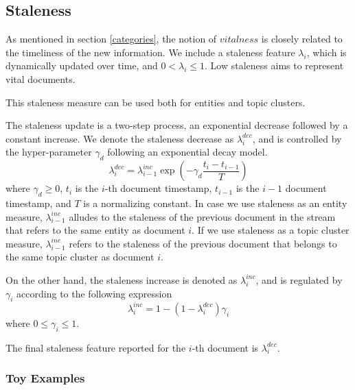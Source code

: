 \documentclass{article}
\begin{document}

\subsection{Staleness}
\label{staleness}

As mentioned in section \ref{categories}, the notion of $vitalness$ is closely related to the timeliness of the new information. We include a staleness feature $\lambda_i$, which is dynamically updated over time, and $0 < \lambda_i \leq 1$. Low staleness aims to represent vital documents.

This staleness measure can be used both for entities and topic clusters.

The staleness update is a two-step process, an exponential decrease followed by a constant increase.
We denote the staleness decrease as $\lambda^{dec}_i$, and is controlled by the hyper-parameter $\gamma_d$ following an exponential decay model.
\begin{equation}
\label{decrease}
\lambda^{dec}_i = \lambda^{inc}_{{i-1}} \exp{(-\gamma_d \frac{t_i-t_{i-1}}{T})}
\end{equation}
where $\gamma_d \geq 0$, $t_i$ is the $i$-th document timestamp, $t_{i-1}$ is the $i-1$ document timestamp, and $T$ is a normalizing constant.
In case we use staleness as an entity measure, $\lambda^{inc}_{i-1}$ alludes to the staleness of the previous document in the stream that refers to the same entity as document $i$.
If we use staleness as a topic cluster measure, $\lambda^{inc}_{i-1}$ refers to the staleness of the previous document that belongs to the same topic cluster as document $i$.

On the other hand, the staleness increase is denoted as $\lambda^{inc}_i$, and is regulated by $\gamma_i$ according to the following expression
\begin{equation}
\lambda^{inc}_i = 1 - (1 - \lambda^{dec}_i) \gamma_i
\end{equation}
where $0 \leq \gamma_i \leq 1$.

The final staleness feature reported for the $i$-th document is $\lambda^{dec}_i$.

\subsubsection{Toy Examples}
\end{document}
